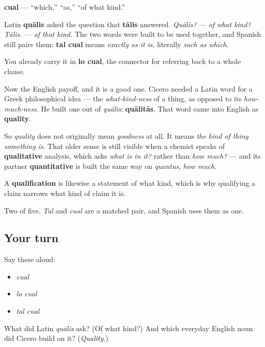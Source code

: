 \begin{cousinweb}
\textbf{cual} — \textquotedblleft{}which,\textquotedblright{} \textquotedblleft{}as,\textquotedblright{} \textquotedblleft{}of what kind.\textquotedblright{}

Latin \textbf{quālis} asked the question that \textbf{tālis} answered. \emph{Quālis?} — \emph{of what kind?} \emph{Tālis.} — \emph{of that kind.} The two words were built to be used together, and Spanish still pairs them: \textbf{tal cual} means \emph{exactly as it is}, literally \emph{such as which}.

You already carry it in \textbf{lo cual}, the connector for referring back to a whole clause.

Now the English payoff, and it is a good one. Cicero needed a Latin word for a Greek philosophical idea — the \emph{what-kind-ness} of a thing, as opposed to its \emph{how-much-ness}. He built one out of \emph{quālis}: \textbf{quālitās}. That word came into English as \textbf{quality}.

So \emph{quality} does not originally mean \emph{goodness} at all. It means \emph{the kind of thing something is}. That older sense is still visible when a chemist speaks of \textbf{qualitative} analysis, which asks \emph{what is in it?} rather than \emph{how much?} — and its partner \textbf{quantitative} is built the same way on \emph{quantus}, \emph{how much}.

A \textbf{qualification} is likewise a statement of what kind, which is why qualifying a claim narrows what kind of claim it is.
\end{cousinweb}

\begin{grammarlens}[title={What you've built}]
Two of five. \emph{Tal} and \emph{cual} are a matched pair, and Spanish uses them as one.
\end{grammarlens}

\subsection*{Your turn}
Say these aloud:

\begin{itemize}
\raggedright
  \item \emph{cual}
  \item \emph{lo cual}
  \item \emph{tal cual}
\end{itemize}

\begin{tcolorbox}[breakable,colback=teal!4,colframe=teal!35!black,title={Before you move on}]
What did Latin \emph{quālis} ask? (Of what kind?) And which everyday English noun did Cicero build on it? (\emph{Quality}.)
\end{tcolorbox}
